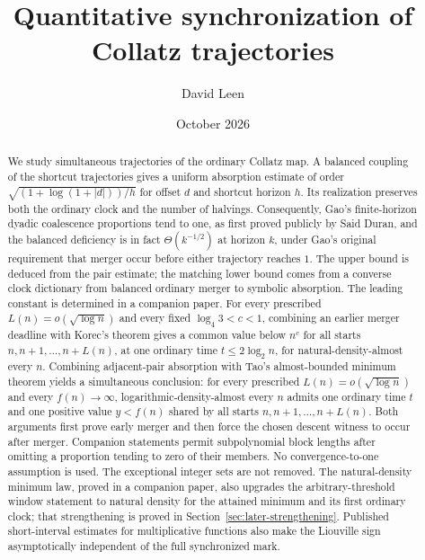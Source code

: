 \documentclass[11pt]{amsart}
\title[Quantitative Collatz synchronization]{Quantitative synchronization of Collatz trajectories}
\author{David Leen}
\date{October 2026}
\theoremstyle{definition}
\theoremstyle{remark}
\begin{document}
\begin{abstract}
We study simultaneous trajectories of the ordinary Collatz map. A balanced coupling of the shortcut trajectories gives a uniform absorption estimate of order
$\sqrt{(1+\log(1+|d|))/h}$ for offset $d$ and shortcut horizon $h$.
Its realization preserves both the ordinary clock and the number of halvings.
Consequently, Gao's finite-horizon dyadic coalescence proportions tend to one, as first proved publicly by Said Duran, and the balanced deficiency is in fact $\Theta(k^{-1/2})$ at horizon $k$, under Gao's original requirement that merger occur before either trajectory reaches $1$. The upper bound is deduced from the pair estimate; the matching lower bound comes from a converse clock dictionary from balanced ordinary merger to symbolic absorption. The leading constant is determined in a companion paper.
For every prescribed $L(n)=o(\sqrt{\log n})$ and every fixed $\log_4 3<c<1$, combining an earlier merger deadline with Korec's theorem gives a common value below $n^c$ for all starts $n,n+1,\ldots,n+L(n)$, at one ordinary time $t\le2\log_2 n$, for natural-density-almost every $n$.
Combining adjacent-pair absorption with Tao's almost-bounded minimum theorem yields a simultaneous conclusion: for every prescribed $L(n)=o(\sqrt{\log n})$ and every $f(n)\to\infty$, logarithmic-density-almost every $n$ admits one ordinary time $t$ and one positive value $y<f(n)$ shared by all starts $n,n+1,\ldots,n+L(n)$.
Both arguments first prove early merger and then force the chosen descent witness to occur after merger. Companion statements permit subpolynomial block lengths after omitting a proportion tending to zero of their members.
No convergence-to-one assumption is used. The exceptional integer sets are not removed. The natural-density minimum law, proved in a companion paper, also upgrades the arbitrary-threshold window statement to natural density for the attained minimum and its first ordinary clock; that strengthening is proved in Section~\ref{sec:later-strengthening}. Published short-interval estimates for multiplicative functions also make the Liouville sign asymptotically independent of the full synchronized mark.
\end{abstract}
\maketitle
\end{document}
